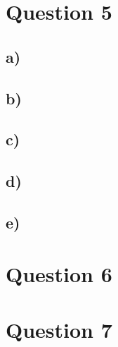 \documentclass{article}
\begin{document}
\section*{Question 5}

\subsection*{a)}
\subsection*{b)}
\subsection*{c)}
\subsection*{d)}
\subsection*{e)}

\section*{Question 6}

\section*{Question 7}
\end{document}
